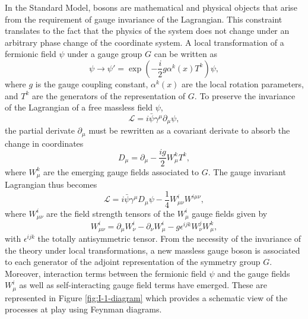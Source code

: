     In the Standard Model, bosons are mathematical and physical objects that arise from the requirement of gauge invariance of the Lagrangian. This constraint translates to the fact that the physics of the system does not change under an arbitrary phase change of the coordinate system. A local transformation of a fermionic field $ \psi $ under a gauge group $ G $  can be written as
    \begin{equation}
      \psi \rightarrow \psi' = \exp\left(- \frac{i}{2} g \alpha^k(x) T^k \right) \psi ,
    \end{equation}
    where $ g $ is the gauge coupling constant, $ \alpha^k(x) $ are the local rotation parameters, and $ T^k $ are the generators of the representation of $ G $. To preserve the invariance of the Lagrangian of a free massless field $ \psi $,
    \begin{equation}
      \mathcal{L} = i \bar{\psi} \gamma^\mu \partial_\mu \psi ,
    \end{equation}
    the partial derivate $ \partial_\mu $ must be rewritten as a covariant derivate to absorb the change in coordinates
    \begin{equation}
      D_\mu = \partial_\mu - \frac{i g}{2} W^k_\mu T^k ,
    \end{equation}
    where $ W^k_\mu $ are the emerging gauge fields associated to $ G $. The gauge invariant Lagrangian thus becomes
    \begin{equation}
      \mathcal{L} = i \bar{\psi} \gamma^\mu D_\mu \psi - \frac{1}{4} W^i_{\mu \nu} W^{i \mu \nu} ,
    \end{equation}
    where $ W^i_{\mu \nu} $ are the field strength tensors of the $ W^i_\mu $ gauge fields given by
    \begin{equation}
      W^i_{\mu \nu} = \partial_\mu W^i_\nu - \partial_\nu W^i_\mu - g \epsilon^{ijk} W^j_\nu W^k_\mu ,
    \end{equation}
    with $ \epsilon^{ijk} $ the totally antisymmetric tensor. From the necessity of the invariance of the theory under local transformations, a new massless gauge boson is associated to each generator of the adjoint representation of the symmetry group $ G $. Moreover, interaction terms between the fermionic field $ \psi $ and the gauge fields $ W^i_\mu $ as well as self-interacting gauge field terms have emerged. These are represented in Figure \ref{fig:I-1-diagram} which provides a schematic view of the processes at play using Feynman diagrams.

